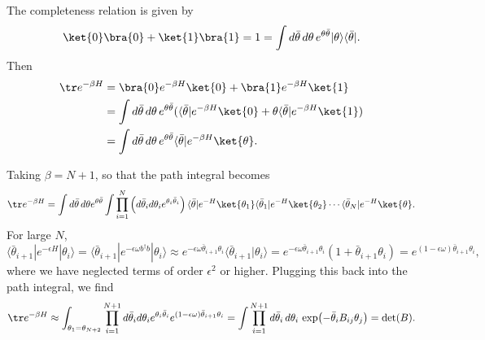 \begin{solution}
    The completeness relation is given by
    \begin{equation}
        \ket{0}\bra{0} + \ket{1}\bra{1} =1 = \int d\bar\theta\,d\theta\,e^{\theta\bar\theta}|\theta\rangle\langle\bar\theta|.
    \end{equation}
    Then
    \begin{equation}
    \begin{aligned}
        \tr e^{-\beta H} &= \bra{0}e^{-\beta H}\ket{ 0} + \bra{1}e^{-\beta H}\ket{1} \\
        &= \int d\bar\theta\,d\theta\,e^{\theta\bar\theta} (\langle\bar\theta|e^{-\beta H}\ket{0}+\theta \langle\bar\theta|e^{-\beta H}\ket{1})\\
        &=\int d\bar\theta\,d\theta\,e^{\theta\bar\theta} \langle\bar\theta|e^{-\beta H}\ket{\theta}.
    \end{aligned}
    \end{equation}

    Taking $\beta = N+1$, so that the path integral becomes
    \begin{equation}
        \begin{aligned}
            \tr e^{-\beta H} = \int d\bar\theta\,d\theta e^{\theta\bar\theta}\int \prod_{i=1}^{N} \left(d\bar\theta_i d\theta_i e^{\theta_i \bar\theta_i}\right)\langle\bar\theta|e^{- H}\ket{\theta_1}\langle\bar\theta_1|e^{- H}\ket{\theta_2}\cdots \langle\bar\theta_N|e^{- H}\ket{\theta}.
        \end{aligned}
    \end{equation}
    For large $N$, 
    \begin{equation}
        \langle\bar\theta_{i+1}|e^{-\epsilon H}|\theta_i\rangle = \langle\bar\theta_{i+1}|e^{-\epsilon\omega b^\dagger b}|\theta_i\rangle \approx e^{-\epsilon\omega\bar\theta_{i+1}\theta_i}\langle\bar\theta_{i+1}|\theta_i\rangle = e^{-\epsilon\omega\bar\theta_{i+1}\theta_i}(1 +\bar\theta_{i+1}\theta_i)= e^{(1-\epsilon\omega)\bar\theta_{i+1}\theta_i},
    \end{equation}
    where we have neglected terms of order $\epsilon^2$ or higher. Plugging this back into the path integral, we find
    \begin{equation}
        \tr e^{-\beta H} \approx \int_{\theta_1 = \theta_{N+2}} \prod_{i=1}^{N+1}d\bar\theta_i d\theta_i e^{\theta_i \bar\theta_i}e^{(1-\epsilon\omega)\bar\theta_{i+1}\theta_i} = \int\prod_{i=1}^{N+1}d\bar\theta_i\,d\theta_i\,\exp\!\left(-\bar\theta_i B_{ij}\theta_j\right) = \det(B).
    \end{equation}


\end{solution}
